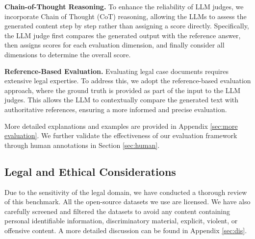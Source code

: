 \textbf{Chain-of-Thought Reasoning.}
To enhance the reliability of LLM judges, we incorporate Chain of Thought (CoT) reasoning, allowing the LLMs to assess the generated content step by step rather than assigning a score directly. Specifically, the LLM judge first compares the generated output with the reference answer, then assigns scores for each evaluation dimension, and finally consider all dimensions to determine the overall score.

\textbf{Reference-Based Evaluation.}
Evaluating legal case documents requires extensive legal expertise. To address this, we adopt the reference-based evaluation approach, where the ground truth is provided as part of the input to the LLM judges. This allows the LLM to contextually compare the generated text with authoritative references, ensuring a more informed and precise evaluation.


More detailed explanations and examples are provided in Appendix \ref{sec:more evaluation}. We further validate the effectiveness of our evaluation framework through human annotations in Section \ref{sec:human}.


\subsection{Legal and Ethical Considerations}
Due to the sensitivity of the legal domain, we have conducted a thorough review of this benchmark. All the open-source datasets we use are licensed. We have also carefully screened and filtered the datasets to avoid any content containing personal identifiable information, discriminatory material, explicit, violent, or offensive content. A more detailed discussion can be found in Appendix \ref{sec:dis}.
